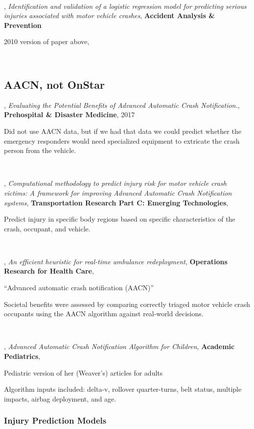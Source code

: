 \

\citep{KONONEN2011112},
{\it Identification and validation of a logistic regression model for predicting serious injuries associated with motor vehicle crashes},
{\bf Accident Analysis \& Prevention}

2010 version of paper above, \citep{13793173920190801}

\

\subsection{AACN, not OnStar}

\citep{15857782520170401},
{\it Evaluating the Potential Benefits of Advanced Automatic Crash Notification.},
{\bf Prehospital \& Disaster Medicine}, 2017

Did not use AACN data, but if we had that data we could predict whether the emergency responders would need specialized equipment to extricate the crash person from the vehicle.

\

\citep{BOSE20111048},
{\it Computational methodology to predict injury risk for motor vehicle crash victims: A framework for improving Advanced Automatic Crash Notification systems},
{\bf Transportation Research Part C: Emerging Technologies},

Predict injury in specific body regions based on specific characteristics of the crash, occupant, and vehicle.

\

\citep{JAGTENBERG201527},
{\it An efficient heuristic for real-time ambulance redeployment},
{\bf Operations Research for Health Care},

``Advanced automatic crash notification (AACN)''

Societal benefits were assessed by comparing
correctly triaged motor vehicle crash occupants using the
AACN algorithm against real-world decisions.

\

\citep{WEAVER20221057},
{\it Advanced Automatic Crash Notification Algorithm for Children},
{\bf Academic Pediatrics},

Pediatric version of her (Weaver's) articles for adults

Algorithm inputs included: delta-v, rollover quarter-turns, belt status, multiple impacts, airbag deployment, and age.

\subsubsection{Injury Prediction Models}

